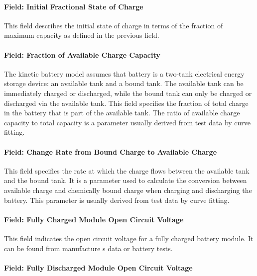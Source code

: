 \paragraph{Field: Initial Fractional State of Charge}\label{field-initial-fractional-state-of-charge}

This field describes the initial state of charge in terms of the fraction of maximum capacity as defined in the previous field.

\paragraph{Field: Fraction of Available Charge Capacity}\label{field-fraction-of-available-charge-capacity}

The kinetic battery model assumes that battery is a two-tank electrical energy storage device: an available tank and a bound tank. The available tank can be immediately charged or discharged, while the bound tank can only be charged or discharged via the available tank. This field specifies the fraction of total charge in the battery that is part of the available tank. The ratio of available charge capacity to total capacity is a parameter usually derived from test data by curve fitting.

\paragraph{Field: Change Rate from Bound Charge to Available Charge}\label{field-change-rate-from-bound-charge-to-available-charge}

This field specifies the rate at which the charge flows between the available tank and the bound tank. It is a parameter used to calculate the conversion between available charge and chemically bound charge when charging and discharging the battery. This parameter is usually derived from test data by curve fitting.

\paragraph{Field: Fully Charged Module Open Circuit Voltage}\label{field-fully-charged-module-open-circuit-voltage}

This field indicates the open circuit voltage for a fully charged battery module. It can be found from manufacture s data or battery tests.

\paragraph{Field: Fully Discharged Module Open Circuit Voltage}\label{field-fully-discharged-module-open-circuit-voltage}

